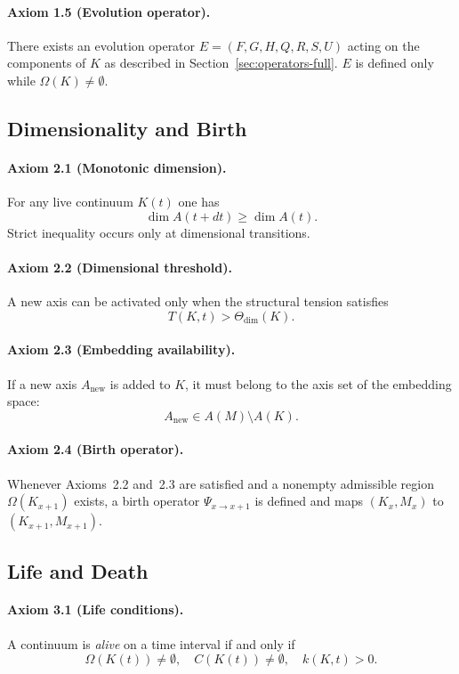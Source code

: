 \paragraph{Axiom 1.5 (Evolution operator).}
There exists an evolution operator
\(E = (F,G,H,Q,R,S,U)\) acting on the components of \(K\) as described in
Section~\ref{sec:operators-full}.  \(E\) is defined only while
\(\Omega(K)\neq\emptyset\).

\subsection{Dimensionality and Birth}

\paragraph{Axiom 2.1 (Monotonic dimension).}
For any live continuum \(K(t)\) one has
\[
  \dim A(t+dt) \ge \dim A(t).
\]
Strict inequality occurs only at dimensional transitions.

\paragraph{Axiom 2.2 (Dimensional threshold).}
A new axis can be activated only when the structural tension satisfies
\[
  T(K,t) > \Theta_{\mathrm{dim}}(K).
\]

\paragraph{Axiom 2.3 (Embedding availability).}
If a new axis \(A_{\mathrm{new}}\) is added to \(K\), it must belong to the
axis set of the embedding space:
\[
  A_{\mathrm{new}}\in A(M)\setminus A(K).
\]

\paragraph{Axiom 2.4 (Birth operator).}
Whenever Axioms~2.2 and~2.3 are satisfied and a nonempty admissible region
\(\Omega(K_{x+1})\) exists, a birth operator \(\Psi_{x\to x+1}\) is defined and
maps \((K_x,M_x)\) to \((K_{x+1},M_{x+1})\).

\subsection{Life and Death}

\paragraph{Axiom 3.1 (Life conditions).}
A continuum is \emph{alive} on a time interval if and only if
\[
  \Omega(K(t))\neq\emptyset,\quad
  C(K(t))\neq\emptyset,\quad
  k(K,t)>0.
\]

